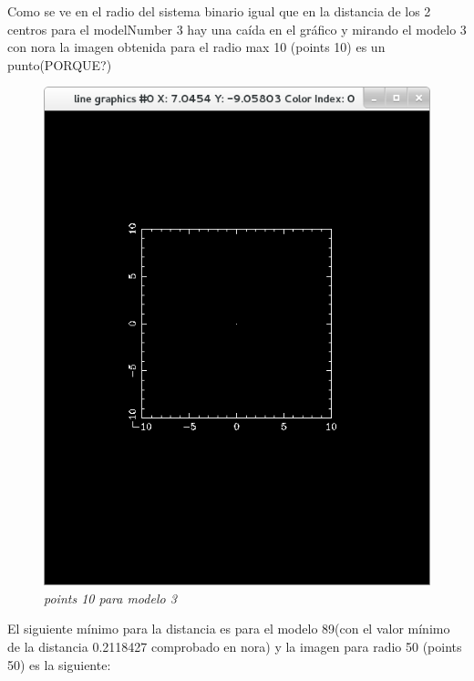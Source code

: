 \documentclass[12pt]{book}
\begin{document}
\begin{itemize}
Como se ve en el radio del sistema binario igual que en la distancia de los 2 centros para el modelNumber 3 hay una caída en el gráfico y mirando el modelo 3 con nora la imagen obtenida para el radio max 10 (points 10) es un punto(PORQUE?)

\begin{figure}[!h]
 \centering
 \includegraphics[scale=0.5]{imgConModel3Points10.png}
 \caption{\emph{points 10 para modelo 3}}
 \label{Fig: 4}
\end{figure}

El siguiente  mínimo para la distancia es para el modelo 89(con el valor mínimo de la distancia 0.2118427 comprobado en nora) y la imagen para radio 50 (points 50) es la siguiente:


\end{itemize}
\end{document}
